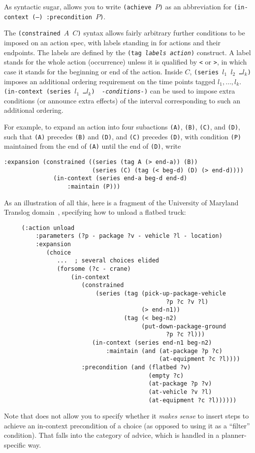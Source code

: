 As syntactic sugar, \lang{} allows you to write {\tt (achieve $P$)} as
an abbreviation for {\tt (in-context (--) :precondition $P$)}.

The {\tt (constrained $A$ $C$\zom)} syntax allows fairly arbitrary further
conditions to be
imposed on an action spec, with labels standing in for actions and their endpoints.  
The labels
are defined by the {\tt (tag {\em labels} {\em action})} construct.  A label 
stands for the whole action (occurrence) unless it is qualified by {\tt <} or
{\tt >}, in which case it stands for the beginning or end of the action. 
Inside $C$, {\tt (series $l_1$ $l_2$ \ldots $l_k$)} imposes an
additional ordering requirement on the time points tagged $l_1,
\ldots, l_k$.  {\tt (in-context (series $l_1$ \ldots $l_k$) {\it
-conditions-})} can be used to impose extra conditions (or announce
extra effects) of the interval corresponding to such an additional ordering.

For example,
to expand an action into four subactions {\tt (A)}, {\tt (B)}, {\tt (C)}, and
{\tt (D)}, such that {\tt (A)} precedes {\tt (B)} and {\tt (D)}, and {\tt (C)}
precedes {\tt (D)}, with condition {\tt (P)} maintained from the end of {\tt (A)}
until the end of {\tt (D)}, write
\begin{verbatim}
:expansion (constrained ((series (tag A (> end-a)) (B))
                         (series (C) (tag (< beg-d) (D) (> end-d))))
              (in-context (series end-a beg-d end-d)
                  :maintain (P)))
\end{verbatim}

As an illustration of all this, here is a fragment of the University of 
Maryland Translog domain~\cite{AndrewsEtal95}, specifying how to unload
a flatbed truck:
\begin{verbatim}
     (:action unload
         :parameters (?p - package ?v - vehicle ?l - location)
         :expansion
            (choice 
               ...  ; several choices elided
               (forsome (?c - crane)
                   (in-context 
                      (constrained 
                          (series (tag (pick-up-package-vehicle 
                                              ?p ?c ?v ?l)
                                       (> end-n1))
                                  (tag (< beg-n2)
                                       (put-down-package-ground 
                                              ?p ?c ?l)))
                         (in-context (series end-n1 beg-n2)
                             :maintain (and (at-package ?p ?c)
                                            (at-equipment ?c ?l))))
                      :precondition (and (flatbed ?v) 
                                         (empty ?c)
                                         (at-package ?p ?v)
                                         (at-vehicle ?v ?l)
                                         (at-equipment ?c ?l))))))

\end{verbatim}
Note that \lang{} does not allow you to specify whether it {\em makes sense} to
insert steps to achieve an in-context precondition of a choice (as opposed to
using it as a ``filter'' condition).  That falls into the category of advice,
which is handled in a planner-specific way.

